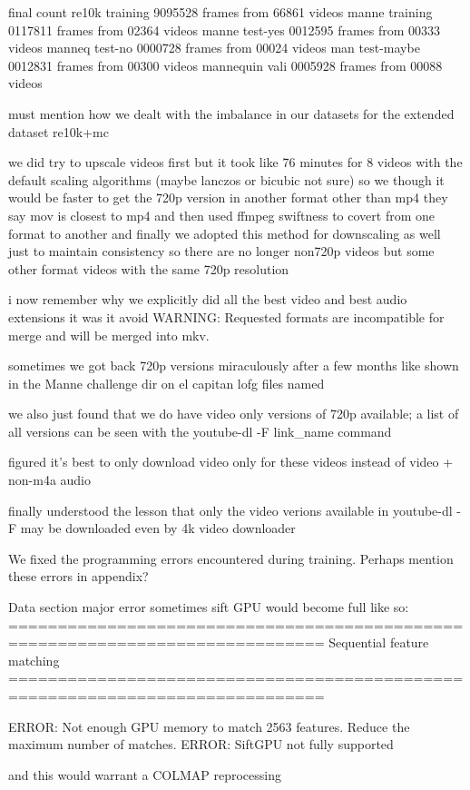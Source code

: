 final count 
re10k training 9095528 frames from 66861 videos 
manne training 0117811 frames from 02364 videos
manne test-yes 0012595 frames from 00333 videos
manneq test-no 0000728 frames from 00024 videos
man test-maybe 0012831 frames from 00300 videos
mannequin vali 0005928 frames from 00088 videos

must mention how we dealt with the imbalance in our datasets for the extended dataset re10k+mc

we did try to upscale videos first but it took like 76 minutes for 8 videos with the default scaling algorithms (maybe lanczos or bicubic not sure) 
so we though it would be faster to get the 720p version in another format other than mp4 they say mov is closest to mp4 and then used ffmpeg swiftness to covert from one format to another
and finally we adopted this method for downscaling as well
just to maintain consistency 
so there are no longer non720p videos but some other format videos with the same 720p resolution

i now remember why we explicitly did all the best video and best audio extensions it was it avoid 
WARNING: Requested formats are incompatible for merge and will be merged into mkv.

sometimes we got back 720p versions miraculously after a few months like shown in the Manne challenge dir on el capitan lofg files named


we also just found that we do have video only versions of 720p available; a list of all versions can be seen with the youtube-dl -F link\_name command

figured it's best to only download video only for these videos instead of video + non-m4a audio

finally understood the lesson that only the video verions available in youtube-dl -F may be downloaded even by 4k video downloader

We fixed the programming errors encountered during training. Perhaps mention these errors in appendix?

Data section major error sometimes sift GPU would become full like so:
==============================================================================
Sequential feature matching
==============================================================================

ERROR: Not enough GPU memory to match 2563 features. Reduce the maximum number of matches.
ERROR: SiftGPU not fully supported

and this would warrant a COLMAP reprocessing

